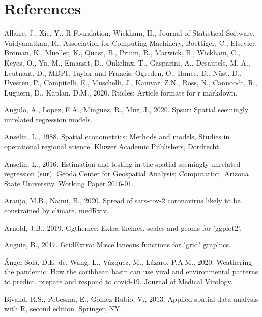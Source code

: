 \documentclass[]{elsarticle} %
\begin{document}
\hypertarget{references}{%
\section*{References}\label{references}}

\hypertarget{refs}{}
\leavevmode\hypertarget{ref-Allaire2020}{}%
Allaire, J., Xie, Y., R Foundation, Wickham, H., Journal of Statistical
Software, Vaidyanathan, R., Association for Computing Machinery,
Boettiger, C., Elsevier, Broman, K., Mueller, K., Quast, B., Pruim, R.,
Marwick, B., Wickham, C., Keyes, O., Yu, M., Emaasit, D., Onkelinx, T.,
Gasparini, A., Desautels, M.-A., Leutnant, D., MDPI, Taylor and Francis,
Ögreden, O., Hance, D., Nüst, D., Uvesten, P., Campitelli, E.,
Muschelli, J., Kamvar, Z.N., Ross, N., Cannoodt, R., Luguern, D.,
Kaplan, D.M., 2020. Rticles: Article formats for r markdown.

\leavevmode\hypertarget{ref-Angulo2020spsur}{}%
Angulo, A., Lopez, F.A., Minguez, R., Mur, J., 2020. Spsur: Spatial
seemingly unrelated regression models.

\leavevmode\hypertarget{ref-Anselin1988spatial}{}%
Anselin, L., 1988. Spatial econometrics: Methods and models, Studies in
operational regional science. Kluwer Academic Publishers, Dordrecht.

\leavevmode\hypertarget{ref-Anselin2016estimation}{}%
Anselin, L., 2016. Estimation and testing in the spatial seemingly
unrelated regression (sur). Geoda Center for Geospatial Analysis;
Computation, Arizona State University. Working Paper 2016-01.

\leavevmode\hypertarget{ref-Araujo2020spread}{}%
Araujo, M.B., Naimi, B., 2020. Spread of sars-cov-2 coronavirus likely
to be constrained by climate. medRxiv.

\leavevmode\hypertarget{ref-Arnold2019}{}%
Arnold, J.B., 2019. Ggthemes: Extra themes, scales and geoms for
'ggplot2'.

\leavevmode\hypertarget{ref-Auguie2017gridextra}{}%
Auguie, B., 2017. GridExtra: Miscellaneous functions for "grid"
graphics.

\leavevmode\hypertarget{ref-deangel2020weathering}{}%
Ángel Solá, D.E. de, Wang, L., Vázquez, M., Lázaro, P.A.M., 2020.
Weathering the pandemic: How the caribbean basin can use viral and
environmental patterns to predict, prepare and respond to covid‐19.
Journal of Medical Virology.

\leavevmode\hypertarget{ref-Bivand2013}{}%
Bivand, R.S., Pebesma, E., Gomez-Rubio, V., 2013. Applied spatial data
analysis with R, second edition. Springer, NY.
\end{document}
